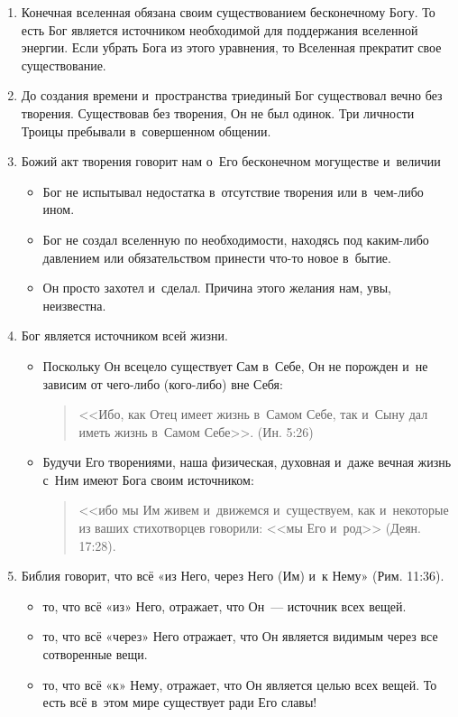\documentclass[a4paper,12pt]{article}
\begin{document}
\begin{enumerate}    

    \item Конечная вселенная обязана своим существованием бесконечному Богу. То есть Бог является источником необходимой для поддержания вселенной энергии. Если убрать Бога из этого уравнения, то Вселенная прекратит свое существование.
    
    \item До создания времени и~пространства триединый Бог существовал вечно без творения. Существовав без творения, Он не был одинок. Три личности Троицы пребывали в~совершенном общении.
    
    \item Божий акт творения говорит нам о~Его бесконечном могуществе и~величии
    \begin{itemize}
        \item Бог не испытывал недостатка в~отсутствие творения или в~чем-либо ином.
        \item Бог не создал вселенную по необходимости, находясь под каким-либо давлением или обязательством принести что-то новое в~бытие.
        \item Он просто захотел и~сделал. Причина этого желания нам, увы, неизвестна.
    \end{itemize}

    \item Бог является источником всей жизни.
    
    \begin{itemize}
        \item Поскольку Он всецело существует Сам в~Себе, Он не порожден и~не зависим от чего-либо (кого-либо) вне Себя:
        \begin{quote}
             <<Ибо, как Отец имеет жизнь в~Самом Себе, так и~Сыну дал иметь жизнь в~Самом Себе>>. (Ин. 5:26)
        \end{quote}
        \item Будучи Его творениями, наша физическая, духовная и~даже вечная жизнь с~Ним имеют Бога своим источником:
        \begin{quote}
            <<ибо мы Им живем и~движемся и~существуем, как и~некоторые из ваших стихотворцев говорили: <<мы Его и~род>> (Деян. 17:28).
        \end{quote} 
    \end{itemize}

    \item Библия говорит, что всё «из Него, через Него (Им) и~к Нему» (Рим. 11:36).
    
    \begin{itemize}
        \item то, что всё «из» Него, отражает, что Он~--- источник всех вещей.
        \item то, что всё «через» Него отражает, что Он является видимым через все сотворенные вещи.
        \item то, что всё «к» Нему, отражает, что Он является целью всех вещей. То есть всё в~этом мире существует ради Его славы!
    \end{itemize}
\end{enumerate}
\end{document}
